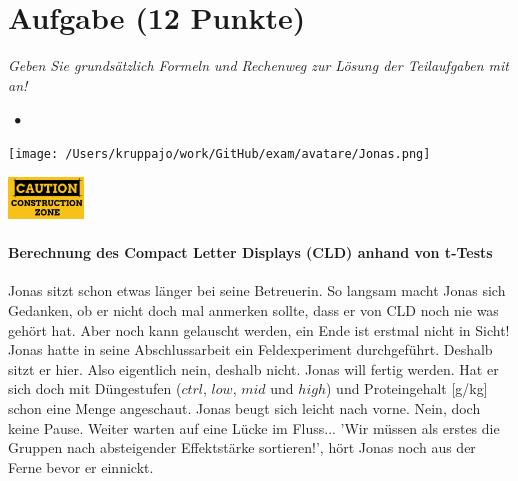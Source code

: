 \documentclass[a4paper, 9pt]{scrartcl}\usepackage[]{graphicx}\usepackage[]{xcolor}
\begin{document}
 
\clearpage

\section{Aufgabe \hfill (12 Punkte)}

\textit{Geben Sie grundsätzlich Formeln und Rechenweg zur Lösung der Teilaufgaben mit an!} \\[1Ex]
 

 
\ifcollection
\begin{flushright}
\tiny\vspace{-3Ex}
\textbf{\examinhaltstart}
\exammodulestatversuch $\;\bullet$
\exammodulebiostat
\vspace{-4Ex}
\end{flushright}
\begin{minipage}[t]{0.5\textwidth}
\texttt{[image: /Users/kruppajo/work/GitHub/exam/avatare/Jonas.png]}
\end{minipage}
\begin{minipage}[t]{0.5\textwidth}
\hfill
\href{https://youtu.be/RagTFFKFbFg}{\includegraphics[width = 2cm]{img/caution}}
\end{minipage}
\vspace{-3ex}
\fi



\ifcollection
\paragraph{Berechnung des Compact Letter Displays (CLD) anhand von t-Tests}
\fi

Jonas sitzt schon etwas länger bei seine Betreuerin. So langsam macht Jonas sich Gedanken, ob er nicht doch mal anmerken sollte, dass er von CLD noch nie was gehört hat. Aber noch kann gelauscht werden, ein Ende ist erstmal nicht in Sicht! Jonas hatte in seine Abschlussarbeit ein Feldexperiment durchgeführt. Deshalb sitzt er hier. Also eigentlich nein, deshalb nicht. Jonas will fertig werden. Hat er sich doch mit Düngestufen ($ctrl$, $low$, $mid$ und $high$) und Proteingehalt [g/kg] schon eine Menge angeschaut. Jonas beugt sich leicht nach vorne. Nein, doch keine Pause. Weiter warten auf eine Lücke im Fluss... 'Wir müssen als erstes die Gruppen nach absteigender Effektstärke sortieren!', hört Jonas noch aus der Ferne bevor er einnickt.
\end{document}

